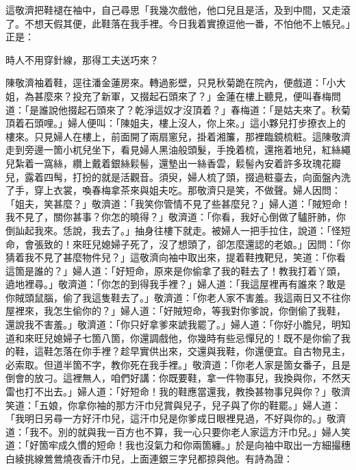 這敬濟把鞋褪在袖中，自己尋思「我幾次戲他，他口兒且是活，及到中間，又走滾了。不想天假其便，此鞋落在我手裡。今日我着實撩逗他一番，不怕他不上帳兒。」正是：

\begin{myquote}
時人不用穿針線，那得工夫送巧來？
\end{myquote}

陳敬濟袖着鞋，逕往潘金蓮房來。轉過影壁，只見秋菊跪在院內，便戲道：「小大姐，為甚麼來？投充了新軍，又掇起石頭來了？」{}金蓮在樓上聽見，便叫春梅問道：「是誰說他掇起石頭來了？乾淨這奴才沒頂着？」春梅道：「是姑夫來了。秋菊頂着石頭哩。」婦人便叫：「陳姐夫，樓上沒人，{}你上來。」這小夥兒打步撩衣上的樓來。只見婦人在樓上，前面開了兩扇窻兒，掛着湘簾，那裡臨鏡梳粧。這陳敬濟走到旁邊一箇小杌兒坐下，看見婦人黑油般頭髮，手挽着梳，還拖着地兒，紅絲繩兒紮着一窩絲，纘上戴着銀絲鬏髻，還墊出一絲香雲，鬏髻內安着許多玫瑰花瓣兒，露着四髩，打扮的就是活觀音。{}須臾，婦人梳了頭，掇過粧臺去，向面盤內洗了手，穿上衣裳，喚春梅拿茶來與姐夫吃。那敬濟只是笑，不做聲。{}婦人因問：「姐夫，笑甚麼？」敬濟道：「我笑你管情不見了些甚麼兒？」婦人道：「賊短命！我不見了，關你甚事？你怎的曉得？」敬濟道：「你看，我好心倒做了驢肝肺，你倒訕起我來。恁說，我去了。」抽身往樓下就走。被婦人一把手拉住，說道：「怪短命，會張致的！來旺兒媳婦子死了，沒了想頭了，卻怎麼還認的老娘。」{}因問：「你猜着我不見了甚麼物件兒？」這敬濟向袖中取出來，提着鞋拽靶兒，笑道：「你看這箇是誰的？」婦人道：「好短命，原來是你偷拿了我的鞋去了！教我打着丫頭，遶地裡尋。」敬濟道：「你怎的到得我手裡？」婦人道：「我這屋裡再有誰來？敢是你賊頭鼠腦，偷了我這隻鞋去了。」敬濟道：「你老人家不害羞。我這兩日又不往你屋裡來，我怎生偷你的？」婦人道：「好賊短命，等我對你爹說，你倒偷了我鞋，還說我不害羞。」敬濟道：「你只好拿爹來諕我罷了。」婦人道：「你好小膽兒，明知道和來旺兒媳婦子七箇八箇，你還調戲他，你幾時有些忌憚兒的！既不是你偷了我的鞋，這鞋怎落在你手裡？趁早實供出來，交還與我鞋，你還便宜。自古物見主，必索取。但道半箇不字，教你死在我手裡。」敬濟道：「你老人家是箇女番子，且是倒會的放刁。這裡無人，咱們好講：你既要鞋，拿一件物事兒，我換與你，不然天雷也打不出去。」婦人道：「好短命！我的鞋應當還我，教換甚物事兒與你？」敬濟笑道：「五娘，你拿你袖的那方汗巾兒賞與兒子，兒子與了你的鞋罷。」{}婦人道：「我明日另尋一方好汗巾兒，這汗巾兒是你爹成日眼裡見過，不好與你的。」敬濟道：「我不。別的就與我一百方也不算，我一心只要你老人家這方汗巾兒。」婦人笑道：「好箇牢成久慣的短命！我也沒氣力和你兩箇纏。」於是向袖中取出一方細撮穗白綾挑線鶯鶯燒夜香汗巾兒，上面連銀三字兒都掠與他。有詩為證：

